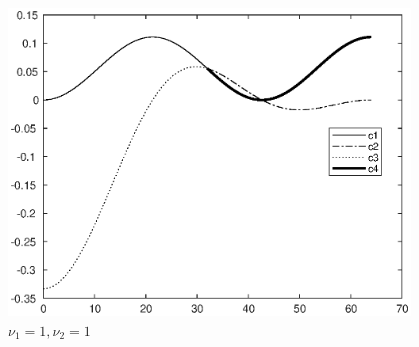\documentclass[twoside,a4paper]{article}
\begin{document}
\begin{figure}[H]
\begin{minipage}[t]{0.32\textwidth}
        \includegraphics[width=0.95\textwidth]{figure/ex9_41_11.eps}
        \caption*{$\nu_1=1,\nu_2=1$}
    \end{minipage}
\end{figure}
\end{document}
